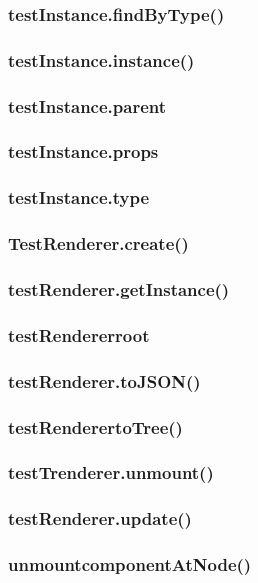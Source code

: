 \documentclass{book}
\begin{document}
\begin{CJK*}{UTF8}{gbsn}
\subsubsection{testInstance.findByType()}
\subsubsection{testInstance.instance()}
\subsubsection{testInstance.parent}
\subsubsection{testInstance.props}
\subsubsection{testInstance.type}
\subsubsection{TestRenderer.create()}
\subsubsection{testRenderer.getInstance()}
\subsubsection{testRendererroot}
\subsubsection{testRenderer.toJSON()}
\subsubsection{testRenderertoTree()}
\subsubsection{testTrenderer.unmount()}
\subsubsection{testRenderer.update()}
\subsubsection{unmountcomponentAtNode()}


\end{CJK*}
\end{document}
